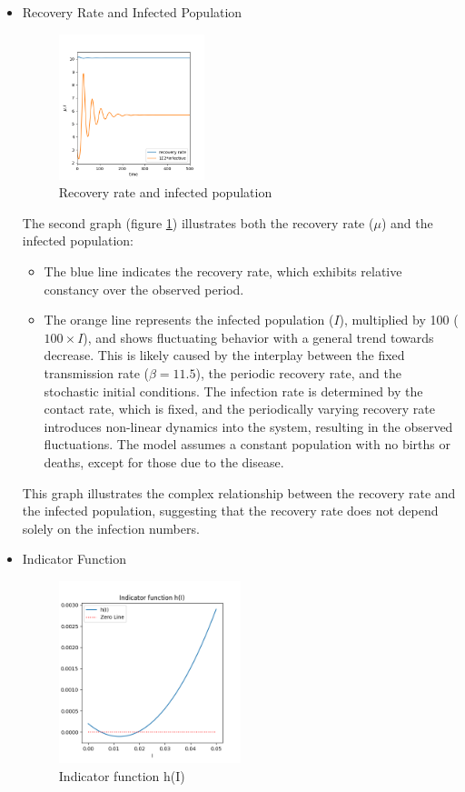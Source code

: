 \begin{itemize}
\begin{itemize}
\item {Recovery Rate and Infected Population}

\begin{figure}[H]
    \centering
    \includegraphics[width=0.4\textwidth]{images/task5/ex4_t5_1b.png}
    \caption{Recovery rate and infected population}
    \label{fig:task5_1b}
\end{figure}

The second graph (figure \ref{fig:task5_1b}) illustrates both the recovery rate ($\mu$) and the infected population:
    \begin{itemize}
        \item The blue line indicates the recovery rate, which exhibits relative constancy over the observed period.
        \item The orange line represents the infected population ($I$), multiplied by 100 ($100 \times I$), and shows fluctuating behavior with a general trend towards decrease. This is likely caused by the interplay between the fixed transmission rate ($\beta = 11.5$), the periodic recovery rate, and the stochastic initial conditions. The infection rate is determined by the contact rate, which is fixed, and the periodically varying recovery rate introduces non-linear dynamics into the system, resulting in the observed fluctuations. The model assumes a constant population with no births or deaths, except for those due to the disease.
    \end{itemize}
This graph illustrates the complex relationship between the recovery rate and the infected population, suggesting that the recovery rate does not depend solely on the infection numbers.


\item{Indicator Function}
\begin{figure}[H]
    \centering
    \includegraphics[width=0.5\textwidth]{images/task5/ex4_t5_1c.png}
    \caption{Indicator function h(I)}
    \label{fig:task5_1c}
\end{figure}
    

\end{itemize}
\end{itemize}
